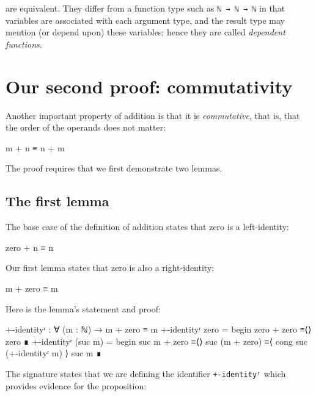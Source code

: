 are equivalent. They differ from a function type such as
\texttt{ℕ\ →\ ℕ\ →\ ℕ} in that variables are associated with each
argument type, and the result type may mention (or depend upon) these
variables; hence they are called \emph{dependent functions}.

\hypertarget{our-second-proof-commutativity}{%
\section{Our second proof:
commutativity}\label{our-second-proof-commutativity}}

Another important property of addition is that it is \emph{commutative},
that is, that the order of the operands does not matter:

\begin{myDisplay}
m + n ≡ n + m
\end{myDisplay}

The proof requires that we first demonstrate two lemmas.

\hypertarget{the-first-lemma}{%
\subsection{The first lemma}\label{the-first-lemma}}

The base case of the definition of addition states that zero is a
left-identity:

\begin{myDisplay}
zero + n ≡ n
\end{myDisplay}

Our first lemma states that zero is also a right-identity:

\begin{myDisplay}
m + zero ≡ m
\end{myDisplay}

Here is the lemma's statement and proof:

\begin{fence}
\begin{code}
+-identityʳ : ∀ (m : ℕ) → m + zero ≡ m
+-identityʳ zero =
  begin
    zero + zero
  ≡⟨⟩
    zero
  ∎
+-identityʳ (suc m) =
  begin
    suc m + zero
  ≡⟨⟩
    suc (m + zero)
  ≡⟨ cong suc (+-identityʳ m) ⟩
    suc m
  ∎
\end{code}
\end{fence}

The signature states that we are defining the identifier
\texttt{+-identityʳ} which provides evidence for the proposition:

